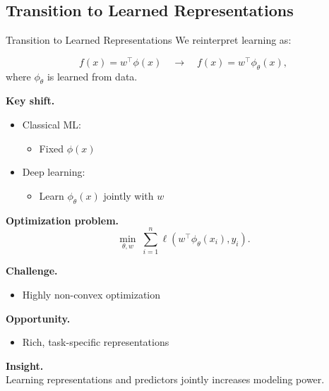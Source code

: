 \documentclass[aspectratio=169,11pt]{beamer}
\begin{document}
\subsection{Transition to Learned Representations}
\begin{frame}[t,allowframebreaks]{Transition to Learned Representations}
\small
We reinterpret learning as:

\[
f(x) = w^\top \phi(x)
\quad \longrightarrow \quad
f(x) = w^\top \phi_\theta(x),
\]
where $\phi_\theta$ is learned from data.

\textbf{Key shift.}\\ \begin{itemize}
    \item Classical ML:
    \begin{itemize}
        \item Fixed $\phi(x)$
    \end{itemize}

    \item Deep learning:
    \begin{itemize}
        \item Learn $\phi_\theta(x)$ jointly with $w$
    \end{itemize}
\end{itemize}

\textbf{Optimization problem.}\\ \[
\min_{\theta, w} \; \sum_{i=1}^n \ell(w^\top \phi_\theta(x_i), y_i).
\]

\textbf{Challenge.}\\ \begin{itemize}
    \item Highly non-convex optimization
\end{itemize}

\textbf{Opportunity.}\\ \begin{itemize}
    \item Rich, task-specific representations
\end{itemize}

\textbf{Insight.}\\ Learning representations and predictors jointly increases modeling power.
\end{frame}
\end{document}
